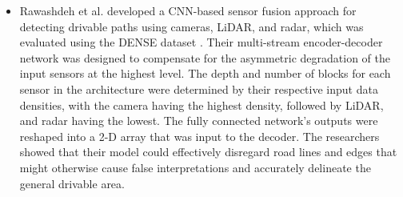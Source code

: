 \documentclass[rnd]{mas_proposal}
\begin{document}
\begin{itemize}
      \item Rawashdeh et al. \cite{rawashdeh2021drivable} developed a CNN-based sensor fusion approach for detecting drivable paths using cameras, LiDAR, and radar, which was evaluated using the DENSE dataset \cite{bijelic2020seeing}. Their multi-stream encoder-decoder network was designed to compensate for the asymmetric degradation of the input sensors at the highest level. The depth and number of blocks for each sensor in the architecture were determined by their respective input data densities, with the camera having the highest density, followed by LiDAR, and radar having the lowest. The fully connected network's outputs were reshaped into a 2-D array that was input to the decoder. The researchers showed that their model could effectively disregard road lines and edges that might otherwise cause false interpretations and accurately delineate the general drivable area.


\end{itemize}
\end{document}

